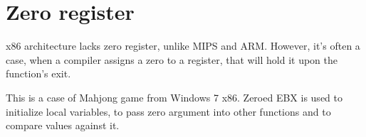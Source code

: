\section{Zero register}

x86 architecture lacks zero register, unlike MIPS and ARM.
However, it's often a case, when a compiler assigns a zero to a register, that will hold it upon the function's exit.

This is a case of Mahjong game from Windows 7 x86.
Zeroed EBX is used to initialize local variables, to pass zero argument into other functions and to compare values against it.



